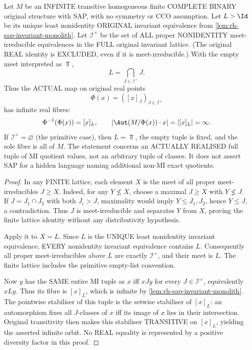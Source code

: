 \begin{corollary}
\label{cor:rh-sap-mi-joint-real-fibre}
Let $M$ be an INFINITE transitive homogeneous
finite COMPLETE BINARY original structure
with SAP, with no symmetry or CCO assumption.
Let $L>\Id$ be its unique least nonidentity
ORIGINAL invariant equivalence from
\cref{lem:rh-sap-invariant-monolith}.
Let $\mathcal I^\times$ be the set of
ALL proper NONIDENTITY meet-irreducible
equivalences in the FULL original invariant
lattice. (The original REAL identity is
EXCLUDED, even if it is meet-irreducible.)
With the empty meet interpreted as $\Top$,
\[
           \boxed{\quad
                L=\bigcap_{J\in\mathcal I^\times}J.
                 \quad}
 \tag{MK}\label{eq:rh-sap-mi-meet}
\]
Thus the ACTUAL map on original real points
\[
          \Phi(x)=([x]_J)_{J\in\mathcal I^\times}
\]
has infinite real fibres:
\[
        \Phi^{-1}(\Phi(x))=[x]_L,\qquad
        \left|\Aut(M/\Phi(x))\cdot x\right|
                    =|[x]_L|=\infty.
\]
If $\mathcal I^\times=\varnothing$
(the primitive case), then $L=\Top$,
the empty tuple is fixed, and the sole
fibre is all of $M$.  The statement
concerns an ACTUALLY REALISED full tuple
of MI quotient values, not an arbitrary
tuple of classes. It does not assert
SAP for a hidden language naming
additional non-MI exact quotients.
\end{corollary}
\begin{proof}
In any FINITE lattice, each element
$X$ is the meet of all proper
meet-irreducibles $J\ge X$.
Indeed, for any $Y\nleq X$, choose
a maximal $J\ge X$ with $Y\nleq J$.
If $J=J_1\cap J_2$ with both
$J_i>J$, maximality would imply
$Y\le J_1,J_2$, hence $Y\le J$,
a contradiction. Thus $J$ is
meet-irreducible and separates
$Y$ from $X$, proving the finite
lattice identity without any
distributivity hypothesis.

Apply it to $X=L$.  Since $L$
is the UNIQUE least nonidentity
invariant equivalence, EVERY
nonidentity invariant equivalence
contains $L$. Consequently all
proper meet-irreducibles above $L$
are exactly $\mathcal I^\times$,
and their meet is $L$.
The finite lattice includes the
primitive empty-list convention.

Now $y$ has the SAME entire MI tuple
as $x$ iff $xJy$ for every
$J\in\mathcal I^\times$, equivalently
$xLy$. Thus its fibre is $[x]_L$,
which is infinite by
\cref{lem:rh-sap-invariant-monolith}.
The pointwise stabiliser of this
tuple is the setwise stabiliser of
$[x]_L$: an automorphism fixes all
$J$-classes of $x$ iff its image
of $x$ lies in their intersection.
Original transitivity then makes
this stabiliser TRANSITIVE on
$[x]_L$, yielding the asserted
infinite orbit. No REAL equality
is represented by a positive
diversity factor in this proof.
\end{proof}


